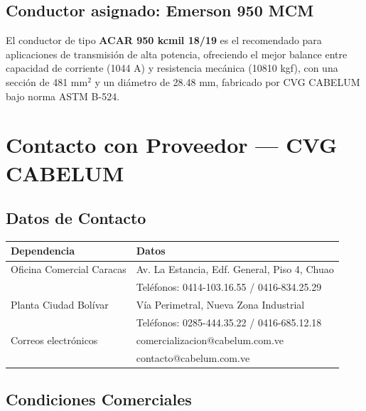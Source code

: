 \documentclass[12pt,a4paper]{article}
\begin{document}
\subsection{Conductor asignado: Emerson 950 MCM}

El conductor de tipo \textbf{ACAR 950 kcmil 18/19} es el recomendado para
aplicaciones de transmisión de alta potencia, ofreciendo el mejor balance
entre capacidad de corriente (1044 A) y resistencia mecánica (10810 kgf),
con una sección de 481 mm$^2$ y un diámetro de 28.48 mm, fabricado por
CVG CABELUM bajo norma ASTM B-524.

\section{Contacto con Proveedor --- CVG CABELUM}

\subsection{Datos de Contacto}

\begin{center}
\begin{tabular}{ll}
\toprule
\textbf{Dependencia} & \textbf{Datos} \\
\midrule
Oficina Comercial Caracas & Av. La Estancia, Edf. General, Piso 4, Chuao \\
& Teléfonos: 0414-103.16.55 / 0416-834.25.29 \\
\midrule
Planta Ciudad Bolívar & Vía Perimetral, Nueva Zona Industrial \\
& Teléfonos: 0285-444.35.22 / 0416-685.12.18 \\
\midrule
Correos electrónicos & comercializacion@cabelum.com.ve \\
& contacto@cabelum.com.ve \\
\bottomrule
\end{tabular}
\end{center}

\subsection{Condiciones Comerciales}
\end{document}
